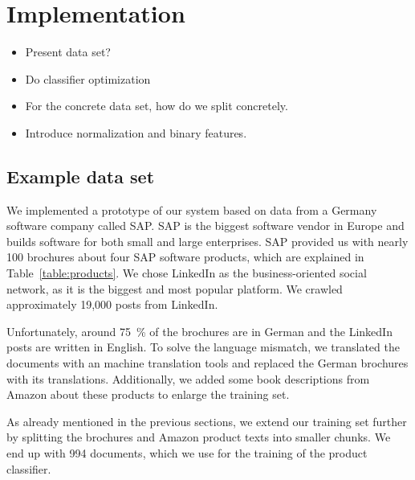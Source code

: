 
\section{Implementation}
\label{sec:implementation}

\begin{itemize}
	\item Present data set?
	\item Do classifier optimization
	\item For the concrete data set, how do we split concretely.
	\item Introduce normalization and binary features.
\end{itemize}

\subsection{Example data set}
\label{sub:initial_data_set}
We implemented a prototype of our \nto system based on data from a Germany software company called SAP.
SAP is the biggest software vendor in Europe and builds software for both small and large enterprises.
SAP provided us with nearly 100 brochures about four SAP software products, which are explained in Table~\ref{table:products}.
We chose LinkedIn as the business-oriented social network, as it is the biggest and most popular platform.
We crawled approximately 19,000 posts from LinkedIn.

Unfortunately, around 75~\% of the brochures are in German and the LinkedIn posts are written in English.
To solve the language mismatch, we translated the documents with an machine translation tools and replaced the German brochures with its translations.
Additionally, we added some book descriptions from Amazon about these products to enlarge the training set.

As already mentioned in the previous sections, we extend our training set further by splitting the brochures and Amazon product texts into smaller chunks.
We end up with 994 documents, which we use for the training of the product classifier.

